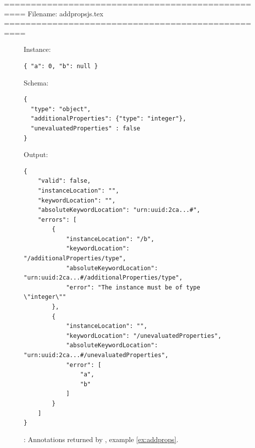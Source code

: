 ==================================================
Filename: addpropsjs.tex
==================================================
\begin{figure}
\small

Instance:
\begin{querybox}{}
\begin{lstlisting}[style=querynonumbers]
{ "a": 0, "b": null }
\end{lstlisting}
\end{querybox}

Schema:
\begin{querybox}{}
\begin{lstlisting}[style=query]
{
  "type": "object",
  "additionalProperties": {"type": "integer"},
  "unevaluatedProperties" : false
}
\end{lstlisting}
\end{querybox}

Output:
\begin{querybox}{}
\begin{lstlisting}[style=query]
{
    "valid": false,
    "instanceLocation": "",
    "keywordLocation": "",
    "absoluteKeywordLocation": "urn:uuid:2ca...#",
    "errors": [
        {
            "instanceLocation": "/b",
            "keywordLocation": "/additionalProperties/type",
            "absoluteKeywordLocation": "urn:uuid:2ca...#/additionalProperties/type",
            "error": "The instance must be of type \"integer\""
        },
        {
            "instanceLocation": "",
            "keywordLocation": "/unevaluatedProperties",
            "absoluteKeywordLocation": "urn:uuid:2ca...#/unevaluatedProperties",
            "error": [
                "a",
                "b"
            ]
        }
    ]
}
\end{lstlisting}
\end{querybox}
\caption{{\qunProps}: Annotations returned by {\JSD}, example \ref{ex:addprops}.}
\label{fig:addpropsjs}
\end{figure}


